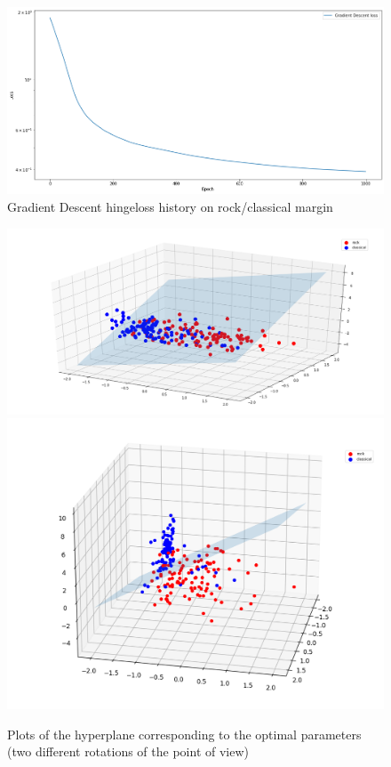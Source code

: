 \documentclass[12pt]{article}
\begin{document}
	\begin{figure}[H]
		\hspace{20pt}\includegraphics[scale=0.5]{gd1}
		\caption{Gradient Descent hingeloss history on rock/classical margin}
	\end{figure}
	\begin{figure}[H]
		\includegraphics[scale=0.4]{plane1}
		\includegraphics[scale=0.4]{plane1_side}
		\caption{Plots of the hyperplane corresponding to the optimal parameters (two different rotations of the point of view)}
	\end{figure}
\end{document}
